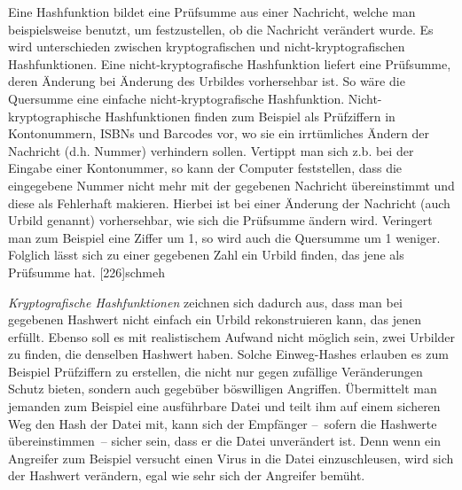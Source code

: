 Eine Hashfunktion bildet eine Prüfsumme aus einer Nachricht, welche man beispielsweise benutzt, um festzustellen, ob die Nachricht verändert wurde. 
Es wird unterschieden zwischen kryptografischen und nicht-kryptografischen Hashfunktionen.
Eine nicht-kryptografische Hashfunktion liefert eine Prüfsumme, deren Änderung bei Änderung des Urbildes vorhersehbar ist.
So wäre die Quersumme eine einfache nicht-kryptografische Hashfunktion.
Nicht-kryptographische Hashfunktionen finden zum Beispiel als Prüfziffern in Kontonummern, ISBNs und Barcodes vor, wo sie ein irrtümliches Ändern der Nachricht (d.h. Nummer) verhindern sollen.
Vertippt man sich z.b. bei der Eingabe einer Kontonummer, so kann der Computer feststellen, dass die eingegebene Nummer nicht mehr mit der gegebenen Nachricht übereinstimmt und diese als Fehlerhaft makieren.
Hierbei ist bei einer Änderung der Nachricht (auch Urbild genannt) vorhersehbar, wie sich die Prüfsumme ändern wird.
Veringert man zum Beispiel eine Ziffer um 1, so wird auch die Quersumme um 1 weniger.
Folglich lässt sich zu einer gegebenen Zahl ein Urbild finden, das jene als Prüfsumme hat. [226]{schmeh}

\emph{Kryptografische Hashfunktionen} zeichnen sich dadurch aus, dass man bei gegebenen Hashwert nicht einfach ein Urbild rekonstruieren kann, das jenen erfüllt.
Ebenso soll es mit realistischem Aufwand nicht möglich sein, zwei Urbilder zu finden, die denselben Hashwert haben. 
Solche Einweg-Hashes erlauben es zum Beispiel Prüfziffern zu erstellen, die nicht nur gegen zufällige Veränderungen Schutz bieten, sondern auch gegebüber böswilligen Angriffen.
Übermittelt man jemanden zum Beispiel eine ausführbare Datei und teilt ihm auf einem sicheren Weg den Hash der Datei mit, kann sich der Empfänger --~sofern die Hashwerte übereinstimmen~-- sicher sein, dass er die Datei unverändert ist.
Denn wenn ein Angreifer zum Beispiel versucht einen Virus in die Datei einzuschleusen, wird sich der Hashwert verändern, egal wie sehr sich der Angreifer bemüht.
